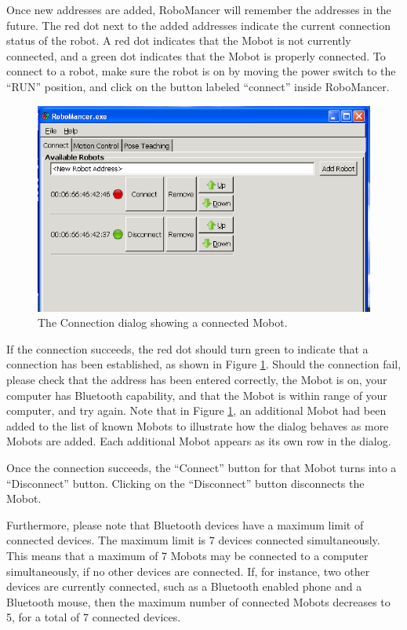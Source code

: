 \documentclass{article}
\begin{document}
Once new addresses are added, RoboMancer will remember the addresses in the future. 
The red dot next to the added addresses indicate
the current connection status of the robot. A red dot indicates that the Mobot
is not currently connected, and a green dot indicates that the Mobot is 
properly connected. To connect to a robot, make sure the robot is on by moving the 
power switch to the ``RUN'' position, and click on the button labeled ``connect'' 
inside RoboMancer.

\begin{figure}[H]
\begin{center}
\includegraphics[width=4.5in]{images/robomancer_screenshot4_connected.png}
\end{center}
\caption{\label{fig:shot4.png} The Connection dialog showing a connected Mobot.}
\end{figure}

If the connection succeeds, the red dot should
turn green to indicate that a connection has been established, as shown in 
Figure \ref{fig:shot4.png}.  Should the connection
fail, please check that the address has been entered correctly, the Mobot is on,
your computer has Bluetooth capability, and that the Mobot is within range of 
your computer, and try again.
Note that in Figure \ref{fig:shot4.png}, an additional
Mobot had been added to the list of known Mobots to illustrate how the dialog
behaves as more Mobots are added. Each additional Mobot appears as its own
row in the dialog.

Once the connection succeeds, the ``Connect'' button for that Mobot turns into
a ``Disconnect'' button. Clicking on the ``Disconnect'' button disconnects
the Mobot.

Furthermore, please note that Bluetooth devices have a maximum limit of connected 
devices. The maximum limit is 7 devices connected simultaneously. This means that 
a maximum of 7 Mobots may be connected to a computer simultaneously, if no
other devices are connected. If, for instance, two other devices are currently 
connected, such as a Bluetooth enabled phone and a Bluetooth mouse, then the 
maximum number of connected Mobots decreases to 5, for a total of 7 connected 
devices.
\end{document}
